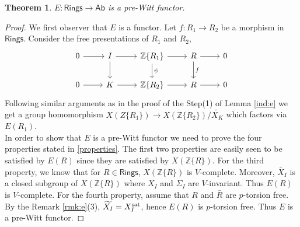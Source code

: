 \documentclass[11pt]{amsart}
\theoremstyle{plain}
\newtheorem{theorem}[thm]{Theorem}
\theoremstyle{definition}
\renewcommand{\tilde}{\widetilde}
\newcommand{\sat}{{\rm sat}}
\newcommand{\Z}{{\mathbb Z}}
\newcommand{\Rings}{{\mathsf{Rings}}}
\newcommand{\Ab}{{\mathsf{Ab}}}
\begin{document}
\begin{theorem}\label{e:pre-witt}$E: \Rings \to \Ab$ is a pre-Witt functor.
\end{theorem}
\begin{proof} We first observer that $E$ is a functor. Let $f : R_1 \to R_2$ be a morphism in $\Rings$. Consider the free presentations of $R_1$ and $R_2$,
\[\begin{tikzcd}
0 \arrow[r] & I \arrow[r] \arrow[d]  & \Z\{R_1\} \arrow[r]\arrow[d, "\psi"]           & R \arrow[r]\arrow[d, "f"]          & 0 \\
0 \arrow[r] & K \arrow[r]           & \Z\{R_2\} \arrow[r]           & R \arrow[r]           & 0 
\end{tikzcd}\]
Following similar arguments as in the proof of the Step(1) of Lemma \ref{ind:e} we get a group homomorphism $X(Z\{R_1\}) \to X(\Z\{R_2\})/\tilde{X_K}$ which factors via $E(R_1)$. \\

In order to show that $E$ is a pre-Witt functor we need to prove the four properties stated in \ref{properties}. The first two properties are easily seen to be satisfied by $E(R)$ since they are satisfied by $X(\Z\{R\})$. For the third property, we know that for $R \in \Rings$, $X(\Z\{R\})$ is $V$-complete. Moreover, $\tilde{X_I}$ is a closed subgroup of $X(\Z\{R\})$ where $X_I$ and $\Sigma_I$ are $V$-invariant. Thus $E(R)$ is $V$-complete. For the fourth property, assume that $R$ and $\bar{R}$ are $p$-torsion free. By the Remark \ref{rmk:e}(3), $\tilde{X_I} = X_I^{\sat}$, hence $E(R)$ is $p$-torsion free. Thus $E$ is a pre-Witt functor. 
\end{proof}
\end{document}
